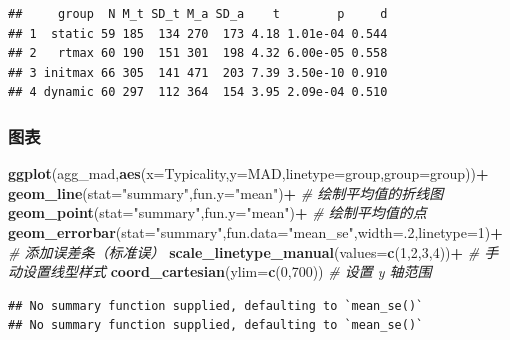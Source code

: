 \documentclass[
]{article}
\newenvironment{Shaded}{\begin{snugshade}}{\end{snugshade}}
\newcommand{\AttributeTok}[1]{\textcolor[rgb]{0.13,0.29,0.53}{#1}}
\newcommand{\CommentTok}[1]{\textcolor[rgb]{0.56,0.35,0.01}{\textit{#1}}}
\newcommand{\DecValTok}[1]{\textcolor[rgb]{0.00,0.00,0.81}{#1}}
\newcommand{\FunctionTok}[1]{\textcolor[rgb]{0.13,0.29,0.53}{\textbf{#1}}}
\newcommand{\NormalTok}[1]{#1}
\newcommand{\SpecialCharTok}[1]{\textcolor[rgb]{0.81,0.36,0.00}{\textbf{#1}}}
\newcommand{\StringTok}[1]{\textcolor[rgb]{0.31,0.60,0.02}{#1}}
\begin{document}
\begin{verbatim}
##     group  N M_t SD_t M_a SD_a    t        p     d
## 1  static 59 185  134 270  173 4.18 1.01e-04 0.544
## 2   rtmax 60 190  151 301  198 4.32 6.00e-05 0.558
## 3 initmax 66 305  141 471  203 7.39 3.50e-10 0.910
## 4 dynamic 60 297  112 364  154 3.95 2.09e-04 0.510
\end{verbatim}

\subsubsection{图表}\label{ux56feux8868}

\begin{Shaded}
\begin{Highlighting}[]
\FunctionTok{ggplot}\NormalTok{(agg\_mad,}\FunctionTok{aes}\NormalTok{(}\AttributeTok{x=}\NormalTok{Typicality,}\AttributeTok{y=}\NormalTok{MAD,}\AttributeTok{linetype=}\NormalTok{group,}\AttributeTok{group=}\NormalTok{group))}\SpecialCharTok{+}
  \FunctionTok{geom\_line}\NormalTok{(}\AttributeTok{stat=}\StringTok{"summary"}\NormalTok{,}\AttributeTok{fun.y=}\StringTok{"mean"}\NormalTok{)}\SpecialCharTok{+}                    \CommentTok{\# 绘制平均值的折线图}
  \FunctionTok{geom\_point}\NormalTok{(}\AttributeTok{stat=}\StringTok{"summary"}\NormalTok{,}\AttributeTok{fun.y=}\StringTok{"mean"}\NormalTok{)}\SpecialCharTok{+}                   \CommentTok{\# 绘制平均值的点}
  \FunctionTok{geom\_errorbar}\NormalTok{(}\AttributeTok{stat=}\StringTok{"summary"}\NormalTok{,}\AttributeTok{fun.data=}\StringTok{"mean\_se"}\NormalTok{,}\AttributeTok{width=}\NormalTok{.}\DecValTok{2}\NormalTok{,}\AttributeTok{linetype=}\DecValTok{1}\NormalTok{)}\SpecialCharTok{+}  \CommentTok{\# 添加误差条（标准误）}
  \FunctionTok{scale\_linetype\_manual}\NormalTok{(}\AttributeTok{values=}\FunctionTok{c}\NormalTok{(}\DecValTok{1}\NormalTok{,}\DecValTok{2}\NormalTok{,}\DecValTok{3}\NormalTok{,}\DecValTok{4}\NormalTok{))}\SpecialCharTok{+}                    \CommentTok{\# 手动设置线型样式}
  \FunctionTok{coord\_cartesian}\NormalTok{(}\AttributeTok{ylim=}\FunctionTok{c}\NormalTok{(}\DecValTok{0}\NormalTok{,}\DecValTok{700}\NormalTok{))                              }\CommentTok{\# 设置 y 轴范围}
\end{Highlighting}
\end{Shaded}

\begin{verbatim}
## No summary function supplied, defaulting to `mean_se()`
## No summary function supplied, defaulting to `mean_se()`
\end{verbatim}
\end{document}
